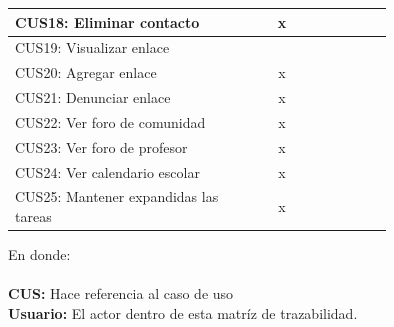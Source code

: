 \documentclass[10pt]{article}
\begin{document}
\begin{table}[ht]
\begin{center}
\begin{tabular}{|p{0.6\linewidth}|c |p{0.15\linewidth}|}
            {CUS18: Eliminar contacto}                               & x             \\ \hline
            {CUS19: Visualizar enlace}                               &               \\ \hline
            {CUS20: Agregar enlace}                                  & x             \\ \hline
            {CUS21: Denunciar enlace}                                & x             \\ \hline
            {CUS22: Ver foro de comunidad}                           & x             \\ \hline
            {CUS23: Ver foro de profesor}                            & x             \\ \hline
            {CUS24: Ver calendario escolar}                          & x             \\ \hline
            {CUS25: Mantener expandidas las tareas}                  & x             \\
            \hline
        \end{tabular}
    \end{center}
\end{table}

\justify
En donde: \\
\textbf{\\}
\textbf{CUS:} Hace referencia al caso de uso \\
\textbf{Usuario:} El actor dentro de esta matríz de trazabilidad.

\newpage
\end{document}
